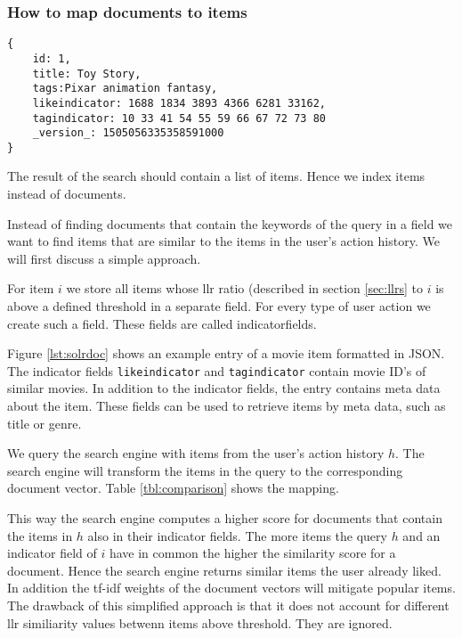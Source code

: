 \subsubsection{How to map documents to items}
\label{sec:mapping}

\begin{lstlisting}[caption={Item meta data and similar items are stored in Solr.},label={lst:solrdoc}]
{
    id: 1,
    title: Toy Story,
    tags:Pixar animation fantasy,
    likeindicator: 1688 1834 3893 4366 6281 33162,
    tagindicator: 10 33 41 54 55 59 66 67 72 73 80
    _version_: 1505056335358591000
}
\end{lstlisting}

The result of the search should contain a list of items. Hence we index items instead of documents.

Instead of finding documents that contain the keywords of the query in a field we want to find items that are similar to the items in the user's action history. We will first discuss a simple approach. 

For item $i$ we store all items whose \gls{llr} ratio (described in section \ref{sec:llrs} to $i$ is above a defined threshold in a separate field. For every type of user action we create such a field. These fields are called \glspl{indicatorfield}. 

Figure \ref{lst:solrdoc} shows an example entry of a movie item formatted in JSON. The indicator fields \verb|likeindicator| and \verb|tagindicator| contain movie ID's of similar movies. In addition to the indicator fields, the entry contains meta data about the item. These fields can be used to retrieve items by meta data, such as title or genre.

We query the search engine with items from the user's action history $h$. The search engine will transform the items in the query to the corresponding document vector. Table \ref{tbl:comparison} shows the mapping.

This way the search engine computes a higher score for documents that contain the items in $h$ also in their indicator fields. The more items the query $h$ and an indicator field of $i$ have in common the higher the similarity score for a document. Hence the search engine returns similar items the user already liked. In addition the tf-idf weights of the document vectors will mitigate popular items. The drawback of this simplified approach is that it does not account for different \gls{llr} similiarity values betwenn items above threshold. They are ignored.

